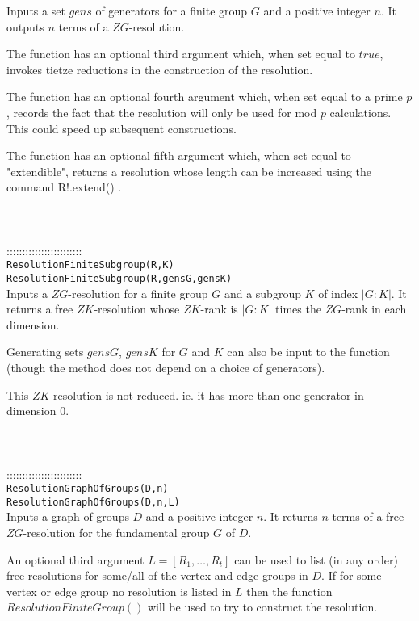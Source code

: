 \documentclass[a4paper,11pt]{report}
\begin{document}
{ Inputs a set $gens$ of generators for a finite group $G$ and a positive integer $n$. It outputs $n$ terms of a $ZG$-resolution.

 The function has an optional third argument which, when set equal to $true$, invokes tietze reductions in the construction of the resolution. 

 The function has an optional fourth argument which, when set equal to a prime $p$, records the fact that the resolution will only be used for mod $p$ calculations. This could speed up subsequent constructions. 

 The function has an optional fifth argument which, when set equal to
"extendible", returns a resolution whose length can be increased using the
command R!.extend() . \\
\\
 \\
 \\
 ::::::::::::::::::::::::\\
 \texttt{ResolutionFiniteSubgroup(R,K)}\\
 \texttt{ResolutionFiniteSubgroup(R,gensG,gensK)}\\
 

 Inputs a $ZG$-resolution for a finite group $G$ and a subgroup $K$ of index $|G:K|$. It returns a free $ZK$-resolution whose $ZK$-rank is $|G:K|$ times the $ZG$-rank in each dimension.

 Generating sets $gensG$, $gensK$ for $G$ and $K$ can also be input to the function (though the method does not depend on a
choice of generators).

 This $ZK$-resolution is not reduced. ie. it has more than one generator in dimension $0$. \\
 \\
 \\
 \\
 ::::::::::::::::::::::::\\
 \texttt{ResolutionGraphOfGroups(D,n) }\\
 \texttt{ResolutionGraphOfGroups(D,n,L) }\\
 

 Inputs a graph of groups $D$ and a positive integer $n$. It returns $n$ terms of a free $ZG$-resolution for the fundamental group $G$ of $D$.

 An optional third argument $L=[R_1 , \ldots , R_t]$ can be used to list (in any order) free resolutions for some/all of the vertex
and edge groups in $D$. If for some vertex or edge group no resolution is listed in $L$ then the function $ResolutionFiniteGroup()$ will be used to try to construct the resolution. 

}
\end{document}
